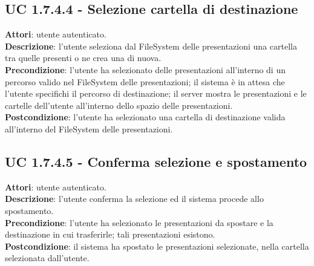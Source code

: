 		\subsection{UC 1.7.4.4 - Selezione cartella di destinazione}{
			\label{uc1.7.4.4}
			\textbf{Attori}: utente autenticato. \\
			\textbf{Descrizione}: l'utente seleziona dal FileSystem delle presentazioni una cartella tra quelle presenti o ne crea una di nuova. \\
			\textbf{Precondizione}: l'utente ha selezionato delle presentazioni all'interno di un percorso valido nel FileSystem delle presentazioni; il sistema è in attesa che l'utente specifichi il percorso di destinazione; il server mostra le presentazioni e le cartelle dell'utente all'interno dello spazio delle presentazioni.	\\
			\textbf{Postcondizione}: l'utente ha selezionato una cartella di destinazione valida all'interno del FileSystem delle presentazioni.	\\
			}
		\subsection{UC 1.7.4.5 - Conferma selezione e spostamento}{
			\label{uc1.7.4.5}
			\textbf{Attori}: utente autenticato. \\
			\textbf{Descrizione}: l'utente conferma la selezione ed il sistema procede allo spostamento. \\
			\textbf{Precondizione}: l'utente ha selezionato le presentazioni da spostare e la destinazione in cui trasferirle; tali presentazioni esistono.	\\
			\textbf{Postcondizione}: il sistema ha spostato le presentazioni selezionate, nella cartella selezionata dall'utente.	\\
			}
